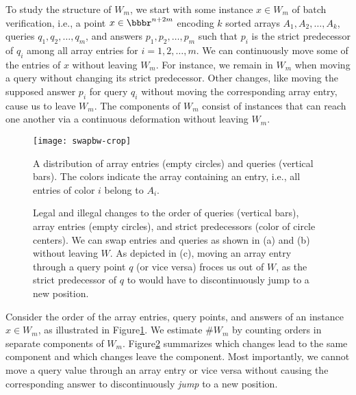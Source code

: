 \documentclass[orivec]{llncs}
\newcommand{\R}{\ensuremath{\bbbr}}
\begin{document}
To study the structure of \(W_m\), we start with some instance \(x \in W_m\) of batch verification, i.e., a point \(x \in \R^{n+2m}\) encoding \(k\) sorted arrays \(A_1,A_2,\dots, A_k\), queries \(q_1,q_2,\dots,q_m\), and answers \(p_1,p_2,\dots,p_m\) such that \(p_i\) is the strict predecessor of \(q_i\) among all array entries for \(i=1,2,\dots,m\). We can continuously move some of the entries of \(x\) without leaving \(W_m\). For instance, we remain in \(W_m\) when moving a query without changing its strict predecessor. Other changes, like moving the supposed answer \(p_i\) for query \(q_i\) without moving the corresponding array entry, cause us to leave \(W_m\). The components of \(W_m\) consist of instances that can reach one another via a continuous deformation without leaving \(W_m\). 
\vspace{-\baselineskip}

\begin{figure}[htb]
	\centering 
	\texttt{[image: swapbw-crop]}
	\caption{A distribution of array entries (empty circles) and queries (vertical bars). The colors indicate the array containing an entry, i.e., all entries of color \(i\) belong to \(A_i\).
	\vspace{-3\baselineskip}
	\label{fig::order}}
\end{figure}
\begin{figure}[htb]
	\centering
	
	
	
	
	\caption{Legal and illegal changes to the order of queries (vertical bars), array entries (empty circles), and strict predecessors (color of circle centers). We can swap entries and queries as shown in (a) and (b) without leaving \(W\). As depicted in (c), moving an array entry through a query point \(q\) (or vice versa) froces us out of \(W\), as the strict predecessor of \(q\) to would have to discontinuously jump to a new position. \label{fig::swaps}}
	\vspace{-\baselineskip}
\end{figure} 

Consider the order of the array entries, query points, and answers of an instance \(x \in W_m\), as illustrated in Figure\nobreakspace \ref {fig::order}. We estimate \(\#W_m\) by counting orders in separate components of \(W_m\).  Figure\nobreakspace \ref {fig::swaps} summarizes which changes lead to the same component and which changes leave the component. Most importantly, we cannot move a query value through an array entry or vice versa without causing the corresponding answer to discontinuously \emph{jump} to a new position. 
\end{document}
